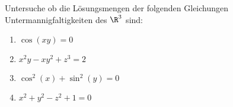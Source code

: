 \begin{prob}
Untersuche ob die Lösungsmengen der folgenden Gleichungen Untermannigfaltigkeiten des $\R^3$ sind:
\begin{enumerate}[label=(\alph*)]
    \item $\cos(xy) = 0$
    \item $x^2y -xy^2 + z^3 = 2$
    \item $\cos^2(x) + \sin^2(y)= 0$
    \item $x^2+y^2-z^2+1=0$
\end{enumerate}
\end{prob}
